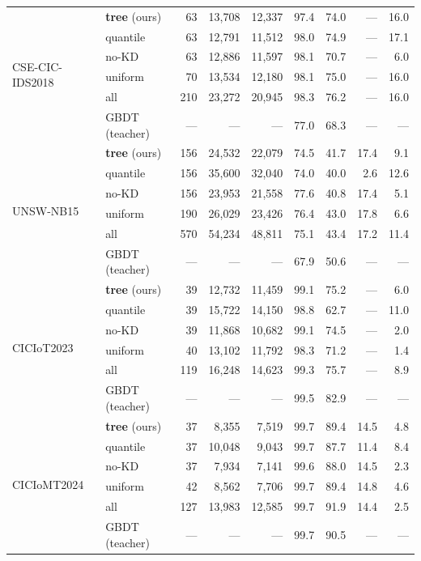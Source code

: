 \begin{table}[!ht]
{\begin{tabular}{l l r r r r r r r}
\midrule
\multirow{6}{*}{CSE-CIC-IDS2018}
& \textbf{tree} (ours) & 63 & 13,708 & 12,337 & 97.4 & 74.0 & --- & 16.0 \\
& quantile & 63 & 12,791 & 11,512 & 98.0 & 74.9 & --- & 17.1 \\
& no-KD & 63 & 12,886 & 11,597 & 98.1 & 70.7 & --- & 6.0 \\
& uniform & 70 & 13,534 & 12,180 & 98.1 & 75.0 & --- & 16.0 \\
& all & 210 & 23,272 & 20,945 & 98.3 & 76.2 & --- & 16.0 \\
& GBDT (teacher) & --- & --- & --- & 77.0 & 68.3 & --- & --- \\
\midrule
\multirow{6}{*}{UNSW-NB15}
& \textbf{tree} (ours) & 156 & 24,532 & 22,079 & 74.5 & 41.7 & 17.4 & 9.1 \\
& quantile & 156 & 35,600 & 32,040 & 74.0 & 40.0 & 2.6 & 12.6 \\
& no-KD & 156 & 23,953 & 21,558 & 77.6 & 40.8 & 17.4 & 5.1 \\
& uniform & 190 & 26,029 & 23,426 & 76.4 & 43.0 & 17.8 & 6.6 \\
& all & 570 & 54,234 & 48,811 & 75.1 & 43.4 & 17.2 & 11.4 \\
& GBDT (teacher) & --- & --- & --- & 67.9 & 50.6 & --- & --- \\
\midrule
\multirow{6}{*}{CICIoT2023}
& \textbf{tree} (ours) & 39 & 12,732 & 11,459 & 99.1 & 75.2 & --- & 6.0 \\
& quantile & 39 & 15,722 & 14,150 & 98.8 & 62.7 & --- & 11.0 \\
& no-KD & 39 & 11,868 & 10,682 & 99.1 & 74.5 & --- & 2.0 \\
& uniform & 40 & 13,102 & 11,792 & 98.3 & 71.2 & --- & 1.4 \\
& all & 119 & 16,248 & 14,623 & 99.3 & 75.7 & --- & 8.9 \\
& GBDT (teacher) & --- & --- & --- & 99.5 & 82.9 & --- & --- \\
\midrule
\multirow{6}{*}{CICIoMT2024}
& \textbf{tree} (ours) & 37 & 8,355 & 7,519 & 99.7 & 89.4 & 14.5 & 4.8 \\
& quantile & 37 & 10,048 & 9,043 & 99.7 & 87.7 & 11.4 & 8.4 \\
& no-KD & 37 & 7,934 & 7,141 & 99.6 & 88.0 & 14.5 & 2.3 \\
& uniform & 42 & 8,562 & 7,706 & 99.7 & 89.4 & 14.8 & 4.6 \\
& all & 127 & 13,983 & 12,585 & 99.7 & 91.9 & 14.4 & 2.5 \\
& GBDT (teacher) & --- & --- & --- & 99.7 & 90.5 & --- & --- \\

\end{tabular}}
\end{table}
